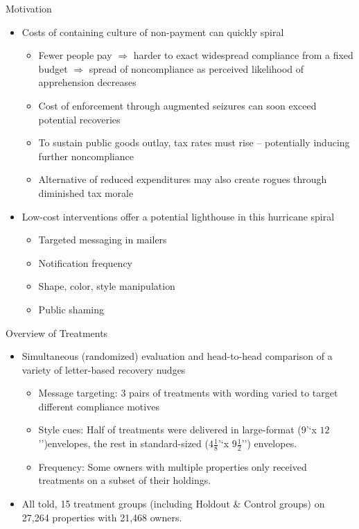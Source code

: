 \documentclass[ignorenonframetext,]{beamer}
\begin{document}
\begin{frame}{Motivation}

\begin{itemize}
\item
  Costs of containing culture of non-payment can quickly spiral

  \begin{itemize}
  \item
    Fewer people pay \(\Rightarrow\) harder to exact widespread
    compliance from a fixed budget \(\Rightarrow\) spread of
    noncompliance as perceived likelihood of apprehension decreases
  \item
    Cost of enforcement through augmented seizures can soon exceed
    potential recoveries
  \item
    To sustain public goods outlay, tax rates must rise -- potentially
    inducing further noncompliance
  \item
    Alternative of reduced expenditures may also create rogues through
    diminished tax morale
  \end{itemize}
\item
  Low-cost interventions offer a potential lighthouse in this hurricane
  spiral

  \begin{itemize}
  \item
    Targeted messaging in mailers
  \item
    Notification frequency
  \item
    Shape, color, style manipulation
  \item
    Public shaming
  \end{itemize}
\end{itemize}

\end{frame}

\begin{frame}{Overview of Treatments}

\begin{itemize}
\item
  Simultaneous (randomized) evaluation and head-to-head comparison of a
  variety of letter-based recovery nudges

  \begin{itemize}
  \item
    Message targeting: 3 pairs of treatments with wording varied to
    target different compliance motives
  \item
    Style cues: Half of treatments were delivered in large-format
    (\(9\)'`x \(12\)'')envelopes, the rest in standard-sized
    (\(4 \frac18\)'`x \(9 \frac12\)'') envelopes.
  \item
    Frequency: Some owners with multiple properties only received
    treatments on a subset of their holdings.
  \end{itemize}
\item
  All told, 15 treatment groups (including Holdout \& Control groups) on
  27,264 properties with 21,468 owners.
\end{itemize}

\end{frame}
\end{document}

